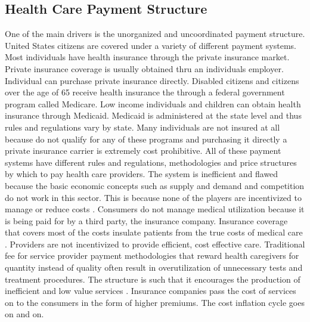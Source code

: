 \documentclass[sigconf]{acmart}
\begin{document}
\subsection{Health Care Payment Structure}
One of the main drivers is the unorganized and uncoordinated payment structure.  United States citizens are covered under a variety of different payment systems. Most individuals have health insurance through the private insurance market.  Private insurance coverage is usually obtained thru an individuals employer. Individual can purchase private insurance directly.   Disabled citizens and citizens over the age of 65 receive health insurance the through a federal government program called Medicare. Low income individuals and children can obtain health insurance through Medicaid. Medicaid is administered at the state level and thus rules and regulations vary by state.  Many individuals are not insured at all because do not qualify for any of these programs and purchasing it directly a private insurance carrier is extremely cost prohibitive.  All of these payment systems have different rules and regulations, methodologies and price structures by which to pay health care providers.
The system is inefficient and flawed because the basic economic concepts such as supply and demand and competition do not work in this sector. This is because none of the players are incentivized to manage or reduce costs \cite{milbank}.  Consumers do not manage medical utilization because it is being paid for by a third party, the insurance company.  Insurance coverage that covers most of the costs insulate patients from the true costs of medical care \cite{milbank}. Providers are not incentivized to provide efficient, cost effective care.  Traditional fee for service provider payment methodologies that reward health caregivers for quantity instead of quality often result in overutilization of unnecessary tests and treatment procedures.  The structure is such that it encourages the production of inefficient and low value services \cite{milbank}.   Insurance companies pass the cost of services on to the consumers in the form of higher premiums. The cost inflation cycle goes on and on.  
\end{document}
